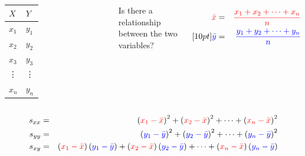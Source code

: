 \begin{frame}

    \begin{columns}

      \begin{tabular}{l|l}
        $X$ & $Y$ \\ \hline
        {\color{red}$x_1$} & {\color{blue}$y_1$} \\
        {\color{red}$x_2$} & {\color{blue}$y_2$}  \\
        {\color{red}$x_3$} & {\color{blue}$y_3$} \\
        {\color{red}\vdots} & {\color{blue}\vdots}  \\
        {\color{red}$x_n$} & {\color{blue}$y_n$}
      \end{tabular}


      Is there a relationship between the two variables?


      \begin{eqnarray*}
        {\color{red}\bar{x}} & = &
        {\color{red}\frac{x_1+x_2+\cdots+x_n}{n}} \\ [10pt]
        {\color{blue}\bar{y}} & = & {\color{blue}\frac{y_1+y_2+\cdots+y_n}{n}}
      \end{eqnarray*}

    \end{columns}

      \begin{eqnarray*}
        s_{xx} & = & \left( {\color{red}x_1-\bar{x}}\right)^2 + \left( {\color{red}x_2-\bar{x}} \right)^2 + \cdots + \left( {\color{red}x_n-\bar{x}} \right)^2 \\
        s_{yy} & = & \left( {\color{blue}y_1-\bar{y}}\right)^2 + \left( {\color{blue}y_2 - \bar{y}} \right)^2 + \cdots + \left( {\color{blue}y_n - \bar{y}}\right)^2 \\
        s_{xy} & = & \left( {\color{red}x_1-\bar{x}}\right)\left( {\color{blue}y_1-\bar{y}}\right) + \left( {\color{red}x_2 - \bar{x}} \right)\left( {\color{blue}y_2 - \bar{y}}\right) + \cdots +
                    \left( {\color{red}x_n-\bar{x}} \right)\left( {\color{blue}y_n - \bar{y}}\right) \\
      \end{eqnarray*}

    \vfill 


\end{frame}



